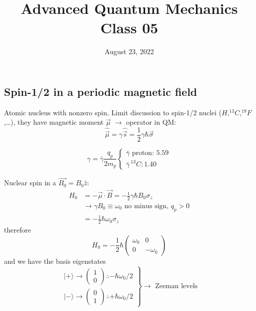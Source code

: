 \documentclass[12pt]{article}
\title{Advanced Quantum Mechanics\\Class 05}
\date{August 23, 2022}                                           %
\newcommand{\be}{\begin{equation}}
\newcommand{\ee}{\end{equation}}
\begin{document}
\maketitle
\subsection{Spin-1/2 in a periodic magnetic field}

Atomic nucleus with nonzero spin.
Limit discussion to spin-1/2 nuclei ($H$,$^{13}C$,$^{19}F$,\ldots),
they have magnetic moment $\vec{\mu}$ $\to$ operator in QM: 
\be
\hat{\vec{\mu}}=\gamma \hat{\vec{s}}=\frac{1}{2} \gamma \hbar \vec{\sigma}
\ee

\be
\gamma=\bar{\gamma} \frac{q_{p}}{2 m_{p}}\left\{\begin{array}{l}\bar{\gamma} \text { proton: } 5.59 \\ \bar{\gamma} \, { }^{13} C: 1.40\end{array}\right.
\ee

Nuclear spin in a $\vec{B_{0}}=B_{0} \hat{z}$:
\be
\begin{aligned} 
H_{0} &=-\vec{\mu} \cdot \vec{B}=-\frac{1}{2} \gamma \hbar B_{0} \sigma_{z} 
\\
&\to \gamma B_0 \equiv \omega_0 \text{ no minus sign, } q_p > 0
\\ 
&=-\frac{1}{2} \hbar \omega_{0} \sigma_{z} 
\end{aligned}
\ee
therefore
\be
H_{0}=-\frac{1}{2} \hbar
\begin{pmatrix}
\omega_{0} & 0 \\ 0 & -\omega_{0}
\end{pmatrix}
\ee
and we have the basis eigenstates
\be
\left.
\begin{array}{l}
|+\rangle \rightarrow\left(\begin{array}{l}1 \\ 0\end{array}\right) \therefore-\hbar \omega_{0} / 2 \\ 
|-\rangle \rightarrow\left(\begin{array}{l}0 \\ 1\end{array}\right) \therefore+\hbar \omega_{0} / 2
\end{array}\right\}
\to \text{ Zeeman levels}
\ee
\end{document}
